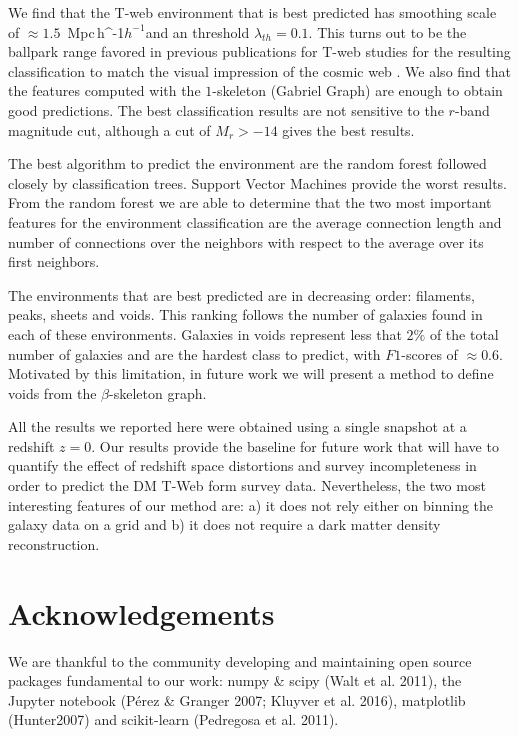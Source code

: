 \documentclass[usenatbib]{mnras}
\newcommand{\Mpch}{\,{\rm Mpc}\,\ifmmode h^{-1}\else $h^{-1}$\fi}
\begin{document}
We find that the T-web environment that is best predicted has smoothing
scale of $\approx1.5$ \Mpch and an threshold $\lambda_{th}=0.1$. 
This turns out to be the ballpark range favored in previous publications
for T-web  studies for the resulting classification to match the visual impression of the cosmic web \citep{Forero-Romero2009}.
We also find that the features computed with the $1$-skeleton 
(Gabriel Graph) are enough to obtain good predictions. 
The best classification results are not sensitive to the $r$-band
magnitude cut, although a cut of $M_r>-14$ gives the best results.

The best algorithm to predict the environment are the random forest followed closely by classification trees. 
Support Vector Machines provide the worst results.
From the random forest we are able to determine that the two most
important features for the environment classification are the average connection length and number of connections over the neighbors with respect to the average over its first neighbors.

The environments that are best predicted are in decreasing order: 
filaments, peaks, sheets and voids. 
This ranking follows the number of galaxies found in each of these environments.
Galaxies in voids represent less that $2\%$ of the total number of galaxies and 
are the hardest class to predict, with $F1$-scores of $\approx0.6$.
Motivated by this limitation, in future work we will present a method to define
voids from the $\beta$-skeleton graph.

All the results we reported here were obtained using a single snapshot at a 
redshift $z=0$.
Our results provide the baseline for future work that will have to quantify 
the effect of redshift space distortions and survey incompleteness in order to
predict  the DM T-Web form survey data.
Nevertheless, the two most interesting features of our method are: a) it does not
rely either on binning the galaxy data on a grid and b) it does not require a dark matter density reconstruction.



\section*{Acknowledgements}

We are thankful to the community developing and maintaining open source packages fundamental to our work: numpy
\&  scipy  (Walt  et  al.  2011),  the  Jupyter  notebook  (P\'erez \& Granger 2007; Kluyver et al. 2016), matplotlib (Hunter2007) and  scikit-learn (Pedregosa et al. 2011).
\end{document}
